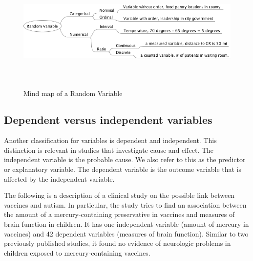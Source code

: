 \documentclass[11pt, chapterprefix=true]{scrbook}\usepackage[]{graphicx}\usepackage[]{color}
\begin{document}
\begin{figure}[htbp]
   \centering
   
   \caption{Mind map of a Random Variable}
   
   \includegraphics[width=12cm, height=6cm]{chapters/Chapter_2/ext_figure/zRV1.png} %
   
\end{figure}


\subsection{Dependent versus independent variables}

Another classification for variables is dependent and independent. This distinction is relevant in studies that investigate cause and effect.  The independent variable is the probable cause.  We also refer to this as the predictor or explanatory variable.  The dependent variable is the outcome variable that is affected by the independent variable.


The following is a description of a clinical study on the possible link between vaccines and autism.   In particular, the study tries to find an association between the amount of a mercury-containing preservative in vaccines and measures of brain function in children.   It has one independent variable (amount of mercury in vaccines) and 42 dependent variables (measures of brain function).  Similar to two previously published studies, it found no evidence of neurologic problems in children exposed to mercury-containing vaccines. \citep{thompson2007}
\end{document}
